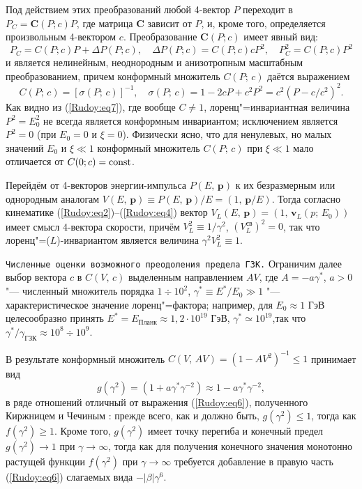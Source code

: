 Под действием этих преобразований любой 4-вектор $P$ переходит в $P_C=\textbf{C}(P;c)P$, где матрица $\textbf{C}$ зависит от
$P$, и, кроме того, определяется произвольным 4-вектором $c$. Преобразование $\textbf{C}(P;c)$ имеет явный вид:
\begin{equation}
P_C=C(P;c)P+\Delta P(P;c), \quad  \Delta P(P;c)=C(P;c)cP^2, \quad P_C^2=C(P;c)P^2 \label{Rudoy:eq7}
\end{equation}
и является нелинейным, неоднородным и анизотропным масштабным преобразованием, причем конформный множитель $C(P;\,c)$ даётся
выражением
\begin{equation}
       C(P;\,c)=[\sigma(P;\,c)]^{-1}, \quad  \sigma(P;\,c)=1-2cP+c^2P^2=c^2(P-c/c^2)^2.
       \label{Rudoy:eq8}
\end{equation}
Как видно из (\ref{Rudoy:eq7}), где вообще $C\neq 1$, лоренц"=инвариантная величина $P^2=E_0^2$ не всегда является конформным
инвариантом; исключением является $P^2=0$ (при $E_0=0$ и $\xi=0$). Физически ясно, что для ненулевых, но малых значений $E_0$ и
$\xi\ll1$ конформный множитель $C(P;\,c)$ при $\xi\ll1$ мало отличается от $C(0;c)=\rm{const}$.

Перейдём от 4-векторов энергии-импульса $P(E,\,\textbf{p})$ к их безразмерным или однородным аналогам $V(E,\,\textbf{p})\equiv
P(E,\,\textbf{p})/E=(1,\,\textbf{p}/E)$. Тогда согласно кинематике (\ref{Rudoy:eq2})--(\ref{Rudoy:eq4}) вектор
$V_L(E,\,\textbf{p})=(1,\,\textbf{v}_L(p;\,E_0))$ имеет смысл 4-вектора скорости, причём $V_L^2\equiv1/\gamma^2$,
$(V_L^{\text{св}})^2=0$, так что лоренц"=($L$)-инвариантом является величина $\gamma^2V_L^2\equiv1$.

\smallskip

{\tt Численные оценки возможного преодоления предела ГЗК.} 
Ограничим далее выбор вектора $c$ в $C(V,\,c)$ выделенным направлением $AV$, где $A=-a\gamma^*$, $a>0$ "--- численный множитель порядка $1\div10^2$, $\gamma^*\equiv E^*/E_0\gg1$ "---
характеристическое значение лоренц"=фактора; например, для $E_0\approx1$ ГэВ целесообразно принять
$E^*=E_{\text{Планк}}\approx1,2\cdot10^{19}$ ГэВ, $\gamma^*\simeq10^{19}$,так что
$\gamma^*/\gamma_{\textrm{ГЗК}}\approx10^8\div10^9$.

В результате конформный множитель $C(V,\,AV)=(1-AV^2)^{-1}\leq1$ принимает вид
\begin{equation}
      g(\gamma^2)=(1+a\gamma^*\gamma^{-2})\approx1-a\gamma^*\gamma^{-2},
      \label{Rudoy:eq9}
\end{equation}
в ряде отношений отличный от выражения (\ref{Rudoy:eq6}), полученного Киржницем и Чечиным \cite{Rudoy:KIRSHNIZ}: прежде всего,
как и должно быть, $g(\gamma^2)\leq1$, тогда как $f(\gamma^2)\geq1$. Кроме того, $g(\gamma^2)$ имеет точку перегиба и конечный
предел $g(\gamma^2)\rightarrow1$ при $\gamma\rightarrow\infty$, тогда как для получения конечного значения монотонно растущей
функции $f(\gamma^2)$ при $\gamma\rightarrow\infty$ требуется добавление в правую часть (\ref{Rudoy:eq6}) слагаемых вида
$-|\beta|\gamma^6$.

